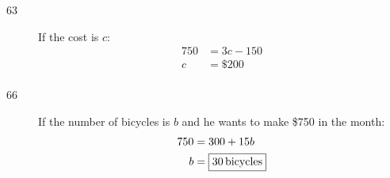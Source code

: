 \documentclass[letterpaper]{exam}
\begin{document}
\begin{description}
            \item[63]
                If the cost is $c$:
                \begin{align*}
                  750 & = 3c - 150 \\
                  c   & = \boxed{ \$ 200 } \\
                \end{align*}
  
            \item[66]
                If the number of bicycles is $b$ and he wants to make \$750 in the month:
                \begin{align*}
                  750 & = 300 + 15b \\
                  b   & = \boxed{ \unit[30]{bicycles} } \\
                \end{align*}
  
        \end{description}

    \fi

    \ifprintanswers{}
        \newpage
    \fi





\end{document}
